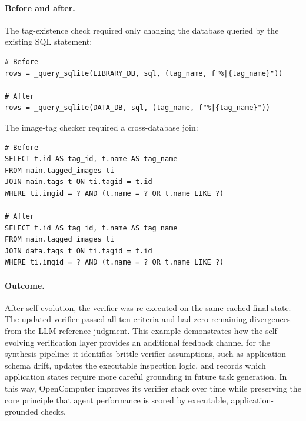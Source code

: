 \paragraph{Before and after.}
The tag-existence check required only changing the database queried by the
existing SQL statement:
\begin{verbatim}
# Before
rows = _query_sqlite(LIBRARY_DB, sql, (tag_name, f"%|{tag_name}"))

# After
rows = _query_sqlite(DATA_DB, sql, (tag_name, f"%|{tag_name}"))
\end{verbatim}

The image-tag checker required a cross-database join:
\begin{verbatim}
# Before
SELECT t.id AS tag_id, t.name AS tag_name
FROM main.tagged_images ti
JOIN main.tags t ON ti.tagid = t.id
WHERE ti.imgid = ? AND (t.name = ? OR t.name LIKE ?)

# After
SELECT t.id AS tag_id, t.name AS tag_name
FROM main.tagged_images ti
JOIN data.tags t ON ti.tagid = t.id
WHERE ti.imgid = ? AND (t.name = ? OR t.name LIKE ?)
\end{verbatim}

\paragraph{Outcome.}
After self-evolution, the verifier was re-executed on the same cached final
state. The updated verifier passed all ten criteria and had zero remaining
divergences from the LLM reference judgment. This example demonstrates how the
self-evolving verification layer provides an additional feedback channel for the
synthesis pipeline: it identifies brittle verifier assumptions, such as
application schema drift, updates the executable inspection logic, and records
which application states require more careful grounding in future task
generation. In this way, OpenComputer improves its verifier stack over time
while preserving the core principle that agent performance is scored by
executable, application-grounded checks.